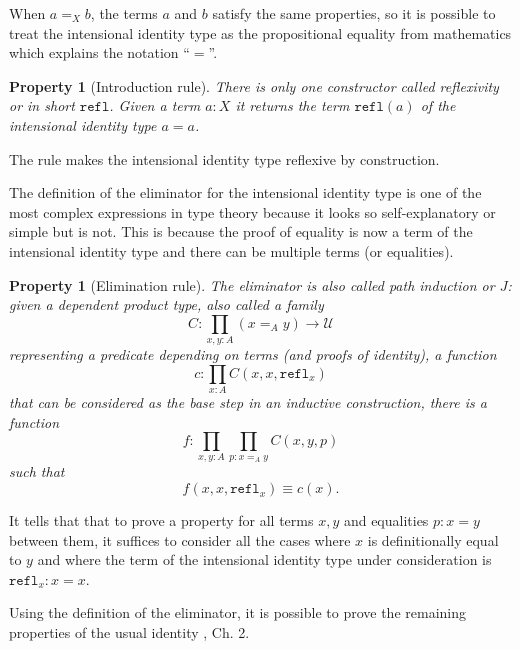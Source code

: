 \documentclass[12pt,a4paper,twoside,xetex]{book} %
\newcommand{\keyword}[1]{\emph{#1}\index{#1}}
\newtheorem{property}[theorem]{Property}
\newcommand{\op}[1]{\mathtt{#1}}
\begin{document}
When $a=_X b$, the terms $a$ and $b$ satisfy the  same properties, so it is possible to treat the intensional identity type as the propositional equality from mathematics which explains the notation ``$=$''. 

\begin{property}[Introduction rule]\label{reflprop}
There is only one constructor called \keyword{reflexivity} or in short 
$\op{refl}$. Given a term $a:X$ it returns the term $\op{refl}(a)$ of the 
intensional identity type  $a = a$. 
\end{property}

The rule  makes the intensional identity type reflexive by construction.

The definition of the eliminator for the intensional identity type is one of 
the most complex expressions in type theory because it looks so self-explanatory 
or simple but is not. This is because the proof of equality is now a term of 
the intensional identity type and there can be multiple terms (or equalities). 

\begin{property}[Elimination rule]\label{pathindprop}
The eliminator is also called \keyword{path 
induction} or $J$: given a dependent product type, also called a 
family
$$C : \prod_{x,y:A} (x =_A y) \rightarrow \mathcal{U}$$
representing a predicate depending on terms (and proofs of identity), a 
function $$c:\prod_{x:A} C(x,x,\op{refl}_x)$$ that can be considered as the base 
step in an inductive construction, there is a function $$f: \prod_{x,y:A} 
\prod_{p:x=_Ay}C(x,y,p)$$ such that $$f(x,x,\op{refl}_x) \equiv c(x).$$
\end{property}


It tells that that to prove a property for all terms $x,y$ and equalities 
$p:x=y$ between them, it suffices to consider all the cases where $x$ is 
definitionally equal to $y$ and where the term of the intensional identity type 
under consideration is $\op{refl}_x : x = x$.


 Using the 
definition of the eliminator, it is possible to prove the remaining properties 
of the usual identity \cite{Voevodsky2013}, Ch. 2. 
\end{document}
